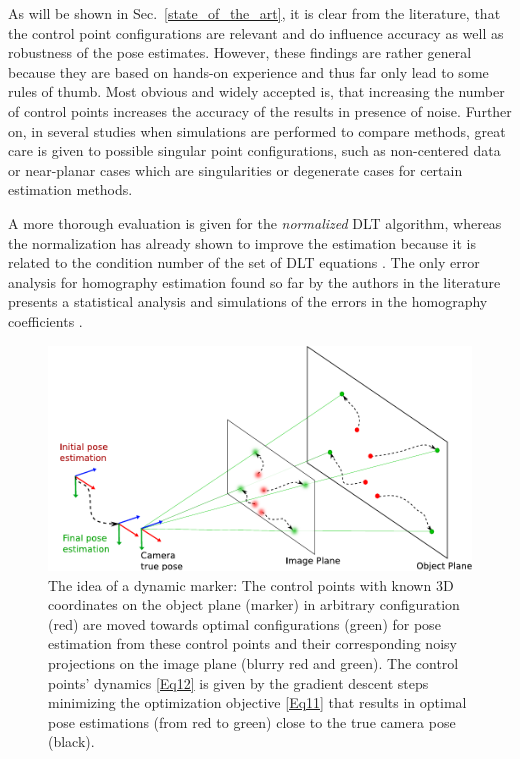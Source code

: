 \documentclass[letterpaper, 10 pt, conference]{ieeeconf}  %
\begin{document}
	As will be shown in Sec.~\ref{state_of_the_art}, it is clear from the literature, that the control point configurations are relevant and do influence accuracy as well as robustness of the pose estimates. 
	However, these findings are rather general because they are based on hands-on experience and thus far only lead to some rules of thumb. Most obvious and widely accepted is, that increasing the number of control points increases the accuracy of the results in presence of noise. Further on, in several studies when simulations are performed to compare methods, great care is given to possible singular point configurations, such as non-centered data or near-planar cases which are singularities or degenerate cases for certain estimation methods. 
	
	A more thorough evaluation is given for the \textit{normalized} DLT algorithm, whereas the normalization has already shown to improve the estimation because it is related to the condition number of the set of DLT equations \cite{Hartley1997}. The only error analysis for homography estimation found so far by the authors in the literature presents a statistical analysis and simulations of the errors in the homography coefficients \cite{Chen2009}.
	
	\begin{figure}[t]
		\begin{center}
			\includegraphics[width=\columnwidth]{img/intro_figure.pdf}
			\caption{\label{fig:intro_figure}\small The idea of a dynamic marker: The control points with known 3D coordinates on the object plane (marker) in arbitrary configuration (red) are moved towards optimal configurations (green) for pose estimation from these control points and their corresponding noisy projections on the image plane (blurry red and green). The control points' dynamics \eqref{Eq12} is given by the gradient descent steps minimizing the optimization objective \eqref{Eq11} that results in optimal pose estimations (from red to green) close to the true camera pose (black).}
		\end{center}
		\vspace{-0.7cm}
	\end{figure}
	
\end{document}
